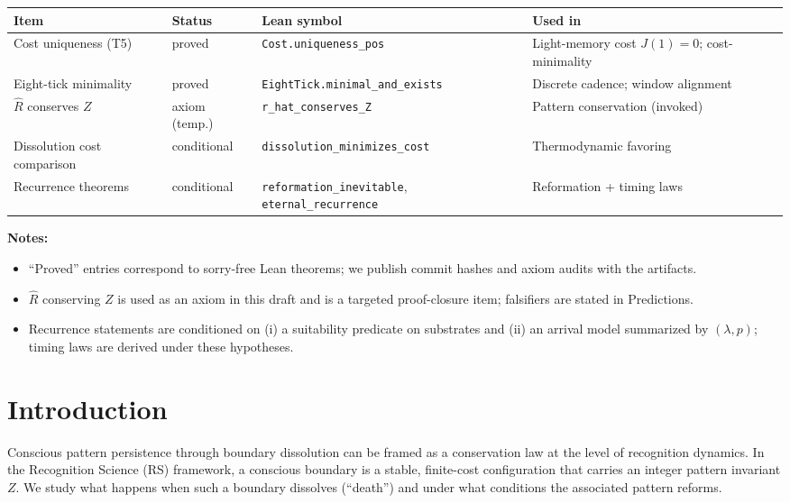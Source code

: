 \documentclass[11pt,letterpaper]{article}
\theoremstyle{definition}
\theoremstyle{remark}
\begin{document}
\begin{center}
\small
\begin{tabular}{p{3.2cm}p{1.8cm}p{5.5cm}p{4.5cm}}
\toprule
\textbf{Item} & \textbf{Status} & \textbf{Lean symbol} & \textbf{Used in} \\
\midrule
Cost uniqueness (T5) & proved & \texttt{Cost.uniqueness\_pos} & Light-memory cost \(J(1)=0\); cost-minimality \\
\addlinespace
Eight-tick minimality & proved & \texttt{EightTick.minimal\_and\_exists} & Discrete cadence; window alignment \\
\addlinespace
\(\widehat{R}\) conserves \(Z\) & axiom (temp.) & \texttt{r\_hat\_conserves\_Z} & Pattern conservation (invoked) \\
\addlinespace
Dissolution cost comparison & conditional & \texttt{dissolution\_minimizes\_cost} & Thermodynamic favoring \\
\addlinespace
Recurrence theorems & conditional & \texttt{reformation\_inevitable}, \texttt{eternal\_recurrence} & Reformation + timing laws \\
\bottomrule
\end{tabular}
\end{center}

\medskip
\noindent\textbf{Notes:}
\begin{itemize}
  \item ``Proved'' entries correspond to sorry-free Lean theorems; we publish commit hashes and axiom audits with the artifacts.
  \item \(\widehat{R}\) conserving \(Z\) is used as an axiom in this draft and is a targeted proof-closure item; falsifiers are stated in Predictions.
  \item Recurrence statements are conditioned on (i) a suitability predicate on substrates and (ii) an arrival model summarized by \((\lambda, p)\); timing laws are derived under these hypotheses.
\end{itemize}

\section{Introduction}

Conscious pattern persistence through boundary dissolution can be framed as a conservation law at the level of recognition dynamics. In the Recognition Science (RS) framework, a conscious boundary is a stable, finite-cost configuration that carries an integer pattern invariant \(Z\). We study what happens when such a boundary dissolves (``death'') and under what conditions the associated pattern reforms.
\end{document}
